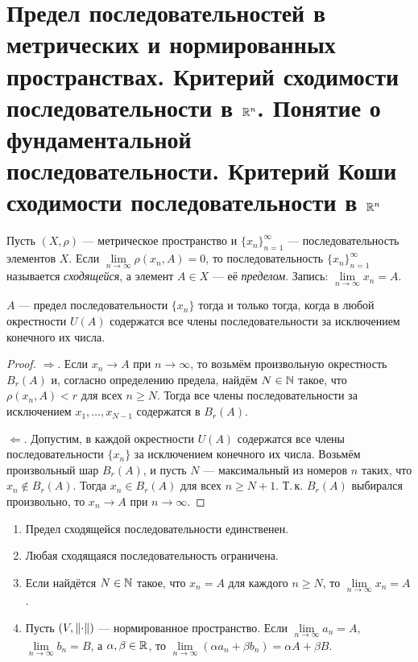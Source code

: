 \section{Предел последовательностей в метрических и нормированных пространствах. Критерий сходимости последовательности в $\mathbb{R}^n$. Понятие о фундаментальной последовательности. Критерий Коши сходимости последовательности в $\mathbb{R}^n$}

\begin{definition}
    Пусть $(X, \rho)$ --- метрическое пространство и $\{x_n\}_{n = 1}^\infty$ --- последовательность элементов $X$. Если $\lim\limits_{n \to \infty}\rho(x_n, A) = 0$, то последовательность $\{x_n\}_{n = 1}^\infty$ называется \textit{сходящейся}, а элемент $A \in X$ --- её \textit{пределом}. Запись: $\lim\limits_{n \to \infty}x_n = A$.
\end{definition}

\begin{proposal}
    $A$ --- предел последовательности $\{x_n\}$ тогда и только тогда, когда в любой окрестности $U(A)$ содержатся все члены последовательности за исключением конечного их числа.
\end{proposal}

\begin{proof}
    $\Rightarrow$. Если $x_n \to A$ при $n \to \infty$, то возьмём произвольную окрестность $B_r(A)$ и, согласно определению предела, найдём $N \in \mathbb{N}$ такое, что $\rho(x_n, A) < r$ для всех $n \geqslant N$. Тогда все члены последовательности за исключением $x_1, \ldots, x_{N - 1}$ содержатся в $B_r(A)$.

    $\Leftarrow$. Допустим, в каждой окрестности $U(A)$ содержатся все члены последовательности $\{x_n\}$ за исключением конечного их числа. Возьмём произвольный шар $B_r(A)$, и пусть $N$ --- максимальный из номеров $n$ таких, что $x_n \notin B_r(A)$. Тогда $x_n \in B_r(A)$ для всех $n \geqslant N + 1$. Т.\,к. $B_r(A)$ выбирался произвольно, то $x_n \to A$ при $n \to \infty$.
\end{proof}

\begin{theorem}
    \begin{enumerate}[nolistsep]
        \item Предел сходящейся последовательности единственен.
        \item Любая сходящаяся последовательность ограничена.
        \item Если найдётся $N \in \mathbb{N}$ такое, что $x_n = A$ для каждого $n \geqslant N$, то $\lim\limits_{n \to \infty}x_n = A$.
        \item Пусть $(V, \left\lVert\cdot\right\rVert)$ --- нормированное пространство. Если $\lim\limits_{n \to \infty}a_n = A$, $\lim\limits_{n \to \infty}b_n = B$, а $\alpha, \beta \in \mathbb{R}$, то $\lim\limits_{n \to \infty}(\alpha a_n + \beta b_n) = \alpha A + \beta B$.
    \end{enumerate}
\end{theorem}

